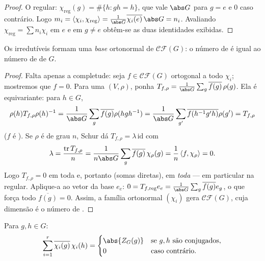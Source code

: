 \begin{proof}
O  regular: $\chi_{\mathrm{reg}}(g) =
\#\{h : gh = h\}$, que vale $\abs G$ para $g = e$ e
$0$ caso contrário. Logo $m_i = \langle \chi_i,\chi_{\mathrm{reg}}\rangle =
\frac1{\abs G}\overline{\chi_i(e)}\,\abs G = n_i$. Avaliando $\chi_{\mathrm{reg}} = \sum n_i\chi_i$ em $e$ e em
$g \neq e$ obtêm-se as duas identidades exibidas.
\end{proof}

\begin{theorem}\label{thm:b3:representations:numberirr}
Os  irredutíveis formam uma \emph{base} ortonormal de $\mathcal{CF}(G)$:
o número de  é igual ao número de  de $G$.
\end{theorem}

\begin{proof}
Falta apenas a completude: seja $f \in \mathcal{CF}(G)$ ortogonal a todo $\chi_i$;
mostremos que $f = 0$. Para uma  $(V,\rho)$, ponha $T_{f,\rho} = \frac{1}{\abs G}
\sum_g \overline{f(g)}\,\rho(g)$.
Ela é equivariante: para $h \in
G$,
\[
\rho(h)T_{f,\rho}\rho(h)^{-1} = \frac1{\abs G}\sum_g
\overline{f(g)}\rho(hgh^{-1})
= \frac1{\abs G}\sum_{g'}\overline{f(h^{-1}g'h)}\rho(g') =
T_{f,\rho}
\]
($f$ é ). Se $\rho$ é  de grau
$n$, Schur dá $T_{f,\rho} = \lambda\,\mathrm{id}$ com
\[
\lambda = \frac{\operatorname{tr}T_{f,\rho}}{n}
= \frac{1}{n\abs G}\sum_g \overline{f(g)}\,\chi_\rho(g)
= \frac1n\,\langle f, \chi_\rho\rangle = 0 .
\]
Logo $T_{f,\rho} = 0$ em toda  e, portanto (somas diretas), em
\emph{toda}  --- em particular na regular. Aplique-a ao
vetor da base $e_e$: $0 = T_{f,\mathrm{reg}}e_e =
\frac1{\abs G}\sum_g\overline{f(g)}e_g$, o que força todo $\overline{f(g)} = 0$. Assim, a família
ortonormal $(\chi_i)$ gera $\mathcal{CF}(G)$, cuja dimensão é o número de .
\end{proof}

\begin{corollary}
\label{cor:b3:representations:column}
Para $g, h \in G$:
\[
\sum_{i=1}^{r}\overline{\chi_i(g)}\,\chi_i(h) =
\begin{cases}
\abs{Z_G(g)} & \text{se } g, h \text{ são conjugados},\\
0 & \text{caso contrário.}
\end{cases}
\]
\end{corollary}

